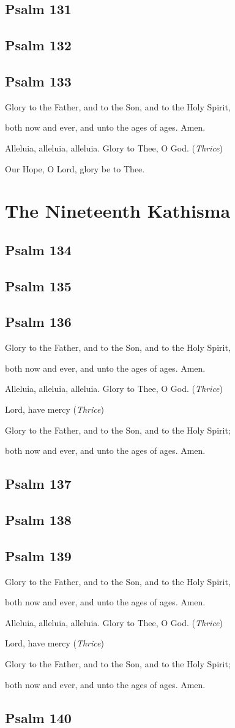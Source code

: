 \documentclass[12pt,openany]{book}
\newcommand{\kathismabreak}{
  \medskip
  \begin{center}
  \begin{footnotesize}
  Glory to the Father, and to the Son, and to the Holy Spirit,
  
  both now and ever, and unto the ages of ages. Amen.

  Alleluia, alleluia, alleluia. Glory to Thee, O God. (\textit{Thrice})

  Lord, have mercy (\textit{Thrice})

  Glory to the Father, and to the Son, and to the Holy Spirit;
  
  both now and ever, and unto the ages of ages. Amen.
  \end{footnotesize}
  \end{center}
  \smallbreak
}
\newcommand{\kathismaend}{
  \medskip
  \begin{center}
  \begin{footnotesize}
  Glory to the Father, and to the Son, and to the Holy Spirit,
  
  both now and ever, and unto the ages of ages. Amen.

  Alleluia, alleluia, alleluia. Glory to Thee, O God. (\textit{Thrice})

  Our Hope, O Lord, glory be to Thee.
  \end{footnotesize}
  \end{center}
  \smallbreak
}
\begin{document}
\section{Psalm 131}

\smallskip
\pagebreak %
\section{Psalm 132}

\smallskip
\section{Psalm 133}


\kathismaend

\chapter*{The Nineteenth Kathisma}
\smallskip
\section{Psalm 134}

\smallskip
\section{Psalm 135}

\smallskip
\section{Psalm 136}


\kathismabreak
\smallskip
\section{Psalm 137}

\smallskip
\section{Psalm 138}

\smallskip
\section{Psalm 139}


\kathismabreak
\smallskip
\section{Psalm 140}

\smallskip
\end{document}
